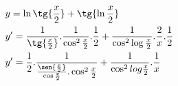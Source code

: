 \begin{ex}
\begin{align}
&y=\ln{\tg{\frac{x}{2}}}+\tg{\ln{\frac{x}{2}}}\nonumber\\
&y'=\frac{1}{\tg{\frac{x}{2}}}.\frac{1}{\cos^2{\frac{x}{2}}}.\frac{1}{2}+\frac{1}{\cos^2{\log{\frac{x}{2}}}}.\frac{2}{x}.\frac{1}{2}\nonumber\\
&y'=\frac{1}{2}.\frac{1}{\frac{\sen{\frac{x}{2}}}{\cos{\frac{x}{2}}}.\cos^2{\frac{x}{2}}}+\frac{1}{\cos^2{log{\frac{x}{2}}}}.\frac{1}{x}\nonumber
\end{align}
\end{ex}